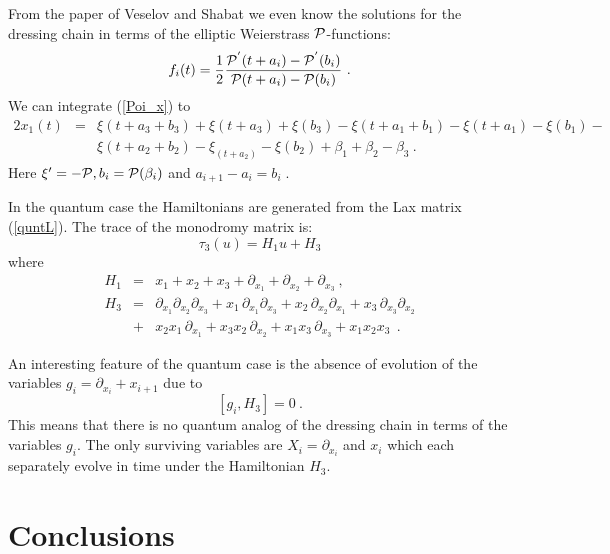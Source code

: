 \documentclass[a4paper,11pt]{article}
\begin{document}
{}From the paper of Veselov and Shabat \cite{Veselov} we even know the
solutions for the dressing chain in terms of the elliptic Weierstrass ${\cal
P}$-functions:
\begin{equation}
\label{Wei}
f_i(t)=\frac{1}{2} \frac{{\cal P}^{'}(t+a_i)
   -{\cal P}^{'}(b_i)}{{\cal P}(t+a_i)-{\cal P}(b_i)} ~.
\end{equation}
We can integrate (\ref{Poi_x}) to
\begin{eqnarray}
\label{x}\nonumber
2x_1(t) \!\!\!&=&\!\!\! \xi(t+a_3+b_3)+\xi (t+a_3)+\xi (b_3)-\xi (t+a_1+b_1)
  -\xi (t+a_1)-\xi (b_1)-\\
& &\xi (t+a_2+b_2)-\xi _(t+a_2)-\xi (b_2)+\beta_1+\beta_2-\beta_3 ~.
\end{eqnarray}
Here $\xi' = - {\cal P}, b_i={\cal P}(\beta _i)$ and $a_{i+1}-a_i=b_i\;$.

In the quantum case the Hamiltonians are generated from the Lax matrix
(\ref{quntL}). The trace of the monodromy matrix is:
\begin{equation}
\label{ta_quant}
\tau_3(u)=H_1u+H_3
\end{equation}
where
\begin{eqnarray}
\label{H_quant}
H_1&=&x_1+x_2+x_3+\partial _{x_1}+\partial _{x_2}+\partial _{x_3} ~,\\
H_3&=&\partial _{x_1}\partial _{x_2}\partial _{x_3}
 +x_1\,\partial _{x_1}\partial _{x_3}+x_2\,\partial _{x_2}\partial _{x_1}
 +x_3\,\partial _{x_3}\partial _{x_2} \nonumber\\
{~} &+&\!\!\! x_2x_1\,\partial _{x_1}+x_3x_2\,\partial _{x_2}+x_1x_3\,\partial _{x_3}
  +x_1x_2x_3 ~~.
\end{eqnarray}

An interesting feature of the quantum case is the absence of evolution of
the variables $g_i=\partial _{x_i} +x_{i+1}$ due to
\begin{equation}
\label{no_ev}
[g_i,H_3]=0 ~.
\end{equation}
This means that there is no quantum analog of the dressing chain in terms of
the variables $g_i$. The only surviving variables are $X_i=\partial _{x_i}$
and $x_i$ which each separately evolve in time under the Hamiltonian $H_3$.


\section{Conclusions}
\end{document}
